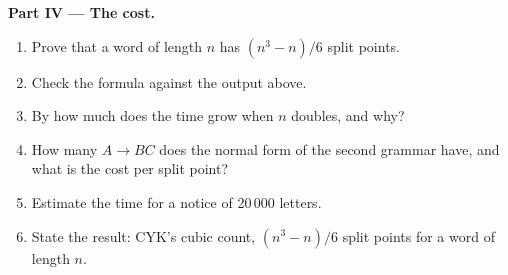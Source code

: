 \begin{problem}
\medskip\noindent\textbf{Part IV --- The cost.}\par\nopagebreak
{}\label{out:b2:context-free-languages:cost}
\begin{enumerate}[resume, beginpenalty=10000]
\item Prove that a word of length $n$ has $(n^3 - n)/6$ split points.
\item Check the formula against the output above.
\item By how much does the time grow when $n$ doubles, and why?
\item How many  $A \to BC$ does the normal form of the second grammar have, and what is the cost per split
point?
\item Estimate the time for a notice of 20\,000 letters.
\item State the result: CYK's cubic count, $(n^3 - n)/6$ split points for a word of length $n$.
\end{enumerate}
\end{problem}
